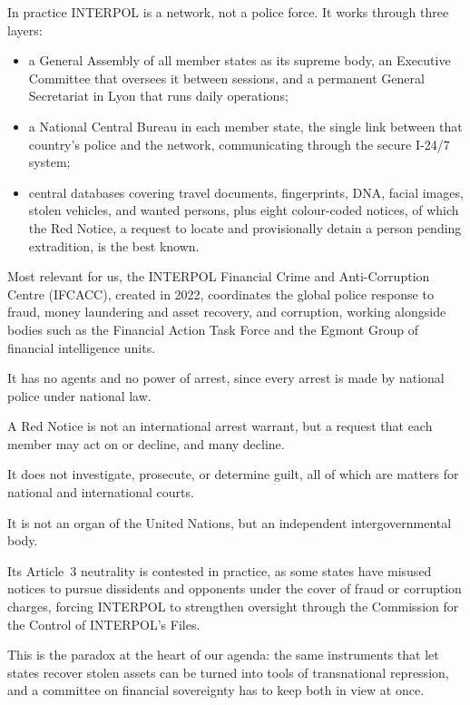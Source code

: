 In practice INTERPOL is a network, not a police force. It works through three layers:

\begin{itemize}
  \item a General Assembly of all member states as its supreme body, an Executive Committee that oversees it between sessions, and a permanent General Secretariat in Lyon that runs daily operations;
  \item a National Central Bureau in each member state, the single link between that country's police and the network, communicating through the secure I-24/7 system;
  \item central databases covering travel documents, fingerprints, DNA, facial images, stolen vehicles, and wanted persons, plus eight colour-coded notices, of which the Red Notice, a request to locate and provisionally detain a person pending extradition, is the best known.
\end{itemize}

Most relevant for us, the INTERPOL Financial Crime and Anti-Corruption Centre (IFCACC), created in 2022, coordinates the global police response to fraud, money laundering and asset recovery, and corruption, working alongside bodies such as the Financial Action Task Force and the Egmont Group of financial intelligence units.

\begin{keypoints}
  \item It has no agents and no power of arrest, since every arrest is made by national police under national law.
  \item A Red Notice is not an international arrest warrant, but a request that each member may act on or decline, and many decline.
  \item It does not investigate, prosecute, or determine guilt, all of which are matters for national and international courts.
  \item It is not an organ of the United Nations, but an independent intergovernmental body.
  \item Its Article~3 neutrality is contested in practice, as some states have misused notices to pursue dissidents and opponents under the cover of fraud or corruption charges, forcing INTERPOL to strengthen oversight through the Commission for the Control of INTERPOL's Files.
\end{keypoints}

This is the paradox at the heart of our agenda: the same instruments that let states recover stolen assets can be turned into tools of transnational repression, and a committee on financial sovereignty has to keep both in view at once.
